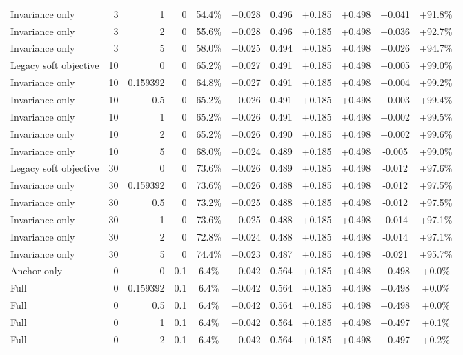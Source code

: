 \begin{table}[htbp]
\begin{tabular}{lrrrccccccc}
Invariance only & 3 & 1 & 0 & 54.4\% & +0.028 & 0.496 & +0.185 & +0.498 & +0.041 & +91.8\% \\
Invariance only & 3 & 2 & 0 & 55.6\% & +0.028 & 0.496 & +0.185 & +0.498 & +0.036 & +92.7\% \\
Invariance only & 3 & 5 & 0 & 58.0\% & +0.025 & 0.494 & +0.185 & +0.498 & +0.026 & +94.7\% \\
Legacy soft objective & 10 & 0 & 0 & 65.2\% & +0.027 & 0.491 & +0.185 & +0.498 & +0.005 & +99.0\% \\
Invariance only & 10 & 0.159392 & 0 & 64.8\% & +0.027 & 0.491 & +0.185 & +0.498 & +0.004 & +99.2\% \\
Invariance only & 10 & 0.5 & 0 & 65.2\% & +0.026 & 0.491 & +0.185 & +0.498 & +0.003 & +99.4\% \\
Invariance only & 10 & 1 & 0 & 65.2\% & +0.026 & 0.491 & +0.185 & +0.498 & +0.002 & +99.5\% \\
Invariance only & 10 & 2 & 0 & 65.2\% & +0.026 & 0.490 & +0.185 & +0.498 & +0.002 & +99.6\% \\
Invariance only & 10 & 5 & 0 & 68.0\% & +0.024 & 0.489 & +0.185 & +0.498 & -0.005 & +99.0\% \\
Legacy soft objective & 30 & 0 & 0 & 73.6\% & +0.026 & 0.489 & +0.185 & +0.498 & -0.012 & +97.6\% \\
Invariance only & 30 & 0.159392 & 0 & 73.6\% & +0.026 & 0.488 & +0.185 & +0.498 & -0.012 & +97.5\% \\
Invariance only & 30 & 0.5 & 0 & 73.2\% & +0.025 & 0.488 & +0.185 & +0.498 & -0.012 & +97.5\% \\
Invariance only & 30 & 1 & 0 & 73.6\% & +0.025 & 0.488 & +0.185 & +0.498 & -0.014 & +97.1\% \\
Invariance only & 30 & 2 & 0 & 72.8\% & +0.024 & 0.488 & +0.185 & +0.498 & -0.014 & +97.1\% \\
Invariance only & 30 & 5 & 0 & 74.4\% & +0.023 & 0.487 & +0.185 & +0.498 & -0.021 & +95.7\% \\
Anchor only & 0 & 0 & 0.1 & 6.4\% & +0.042 & 0.564 & +0.185 & +0.498 & +0.498 & +0.0\% \\
Full & 0 & 0.159392 & 0.1 & 6.4\% & +0.042 & 0.564 & +0.185 & +0.498 & +0.498 & +0.0\% \\
Full & 0 & 0.5 & 0.1 & 6.4\% & +0.042 & 0.564 & +0.185 & +0.498 & +0.498 & +0.0\% \\
Full & 0 & 1 & 0.1 & 6.4\% & +0.042 & 0.564 & +0.185 & +0.498 & +0.497 & +0.1\% \\
Full & 0 & 2 & 0.1 & 6.4\% & +0.042 & 0.564 & +0.185 & +0.498 & +0.497 & +0.2\% \\

\end{tabular}
\end{table}
